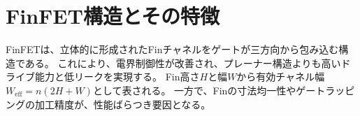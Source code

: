 \section{FinFET構造とその特徴}
FinFETは、立体的に形成されたFinチャネルをゲートが三方向から包み込む構造である。  
これにより、電界制御性が改善され、プレーナー構造よりも高いドライブ能力と低リークを実現する。  
Fin高さ$H$と幅$W$から有効チャネル幅$W_\text{eff} = n(2H + W)$として表される。  
一方で、Finの寸法均一性やゲートラッピングの加工精度が、性能ばらつき要因となる。
